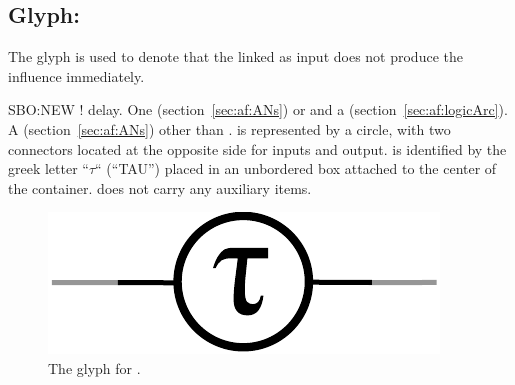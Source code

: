 
\subsection{Glyph: }\label{sec:delay}

The glyph  is used to denote that the  linked as input does not produce the influence immediately.

\begin{glyphDescription}
 \glyphSboTerm SBO:NEW ! delay.
 \glyphOrigin One  (section~\ref{sec:af:ANs}) or and a  (section~\ref{sec:af:logicArc}).
 \glyphTarget A  (section~\ref{sec:af:ANs}) other than .
 \glyphContainer {} is represented by a circle, with two connectors located at the opposite side for inputs and output.
 \glyphLabel {} is identified by the greek letter ``$\tau$`` (``TAU'') placed in an unbordered box attached to the center of the container.
 \glyphAux {} does not carry any auxiliary items.
\end{glyphDescription}

\begin{figure}[H]
  \centering
  \includegraphics[scale = 0.5]{images/delay}
  \caption{The \AF glyph for .}
  \label{fig:delay}
\end{figure}
\normalcolor
